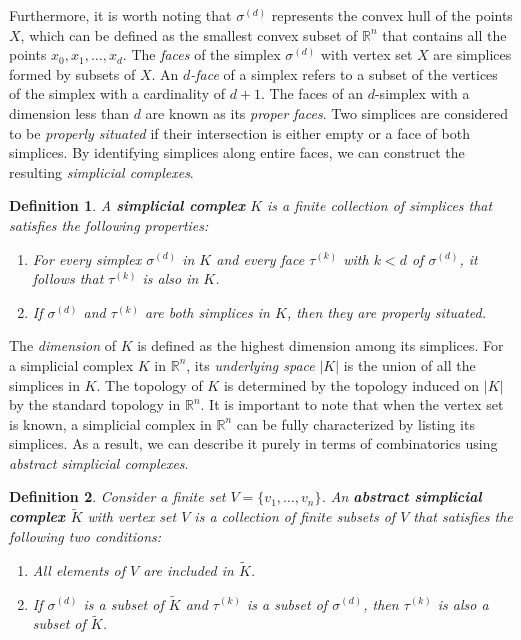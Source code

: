 \documentclass{amsart}
\newtheorem{definition}{Definition}[section]
\begin{document}
Furthermore, it is worth noting that $\sigma^{(d)}$ represents the convex hull of the points $X$, which can be defined as the smallest convex subset of $\mathbb{R}^n$ that contains all the points $x_0, x_1, \ldots, x_d$. The \emph{faces} of the simplex $\sigma^{(d)}$ with vertex set $X$ are simplices formed by subsets of $X$. An \emph{$d$-face} of a simplex refers to a subset of the vertices of the simplex with a cardinality of $d+1$. The faces of an $d$-simplex with a dimension less than $d$ are known as its \emph{proper faces}. Two simplices are considered to be \emph{properly situated} if their intersection is either empty or a face of both simplices. By identifying simplices along entire faces, we can construct the resulting \emph{simplicial complexes}.

\begin{definition}
A \textbf{simplicial complex} $K$ is a finite collection of simplices that satisfies the following properties:
\begin{enumerate}
	\item For every simplex $\sigma^{(d)}$ in $K$ and every face $\tau^{(k)}$ with $k < d$ of $\sigma^{(d)}$, it follows that $\tau^{(k)}$ is also in $K$.
	\item If $\sigma^{(d)}$ and $\tau^{(k)}$ are both simplices in $K$, then they are properly situated.
\end{enumerate}
\end{definition}

The \emph{dimension} of $K$ is defined as the highest dimension among its simplices. For a simplicial complex $K$ in $\mathbb{R}^n$, its \emph{underlying space} $\vert K \vert$ is the union of all the simplices in $K$. The topology of $K$ is determined by the topology induced on $\vert K \vert$ by the standard topology in $\mathbb{R}^n$. It is important to note that when the vertex set is known, a simplicial complex in $\mathbb{R}^n$ can be fully characterized by listing its simplices. As a result, we can describe it purely in terms of combinatorics using \emph{abstract simplicial complexes}.

\begin{definition}
Consider a finite set $V = \{v_1, \ldots, v_n\}$. An \textbf{abstract simplicial complex $\tilde{K}$} with vertex set $V$ is a collection of finite subsets of $V$ that satisfies the following two conditions:
\begin{enumerate}
	\item All elements of $V$ are included in $\tilde{K}$.
	\item If $\sigma^{(d)}$ is a subset of $\tilde{K}$ and $\tau^{(k)}$ is a subset of $\sigma^{(d)}$, then $\tau^{(k)}$ is also a subset of $\tilde{K}$.
\end{enumerate}
\end{definition}
\end{document}
